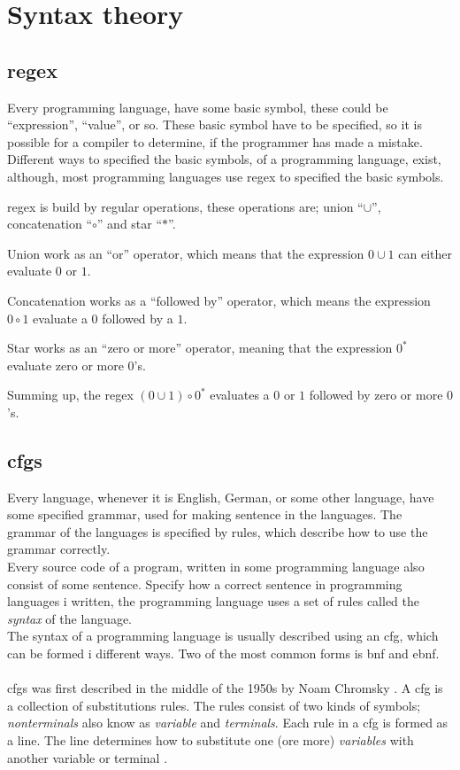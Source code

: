 \pagebreak
\section{Syntax theory}
\subsection{\ac{regex}}
Every programming language, have some basic symbol, these could be ``expression'', ``value'', or so. These basic symbol have to be specified, so it is possible for a compiler to determine, if the programmer has made a mistake. \\
Different ways to specified the basic symbols, of a programming language, exist, although, most programming languages use \ac{regex} to specified the basic symbols. \cite{Fischer2010}

\ac{regex} is build by regular operations, these operations are; union ``$\cup$'', concatenation ``$\circ$'' and star ``$\ast$''.
\begin{description}
	\item Union work as an ``or'' operator, which means that the expression $0 \cup 1$ can either evaluate $0$ or $1$.
	\item Concatenation works as a ``followed by'' operator, which means the expression $0 \circ 1$ evaluate a $0$ followed by a $1$.
	\item Star works as an ``zero or more'' operator, meaning that the expression $0^{\ast}$ evaluate zero or more $0$'s.
\end{description}
Summing up, the \ac{regex} $(0 \cup 1) \circ 0^{\ast}$ evaluates a $0$ or $1$ followed by zero or more $0$'s. \cite{syntax_book}


\subsection{\ac{cfgs}}
Every language, whenever it is English, German, or some other language, have some specified grammar, used for making sentence in the languages. The grammar of the languages is specified by rules, which describe how to use the grammar correctly. \\
Every source code of a program, written in some programming language also consist of some sentence. Specify how a correct sentence in programming languages i written, the programming language uses a set of rules called the \textit{syntax} of the language. \\
The syntax of a programming language is usually described using an \ac{cfg}, which can be formed i different ways. Two of the most common forms is \ac{bnf} and \ac{ebnf}. \\
\\
\ac{cfgs} was first described in the middle of the 1950s by Noam Chromsky \cite{concepts_prog_lang}. A \ac{cfg} is a collection of substitutions rules. The rules consist of two kinds of symbols; \textit{nonterminals} also know as \textit{variable} and \textit{terminals}. Each rule in a \ac{cfg} is formed as a line. The line determines how to substitute one (ore more) \textit{variables} with another variable or terminal \cite{syntax_book}.

